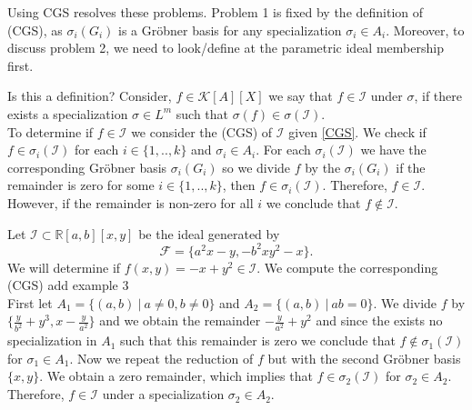 \documentclass[runningheads]{llncs}
\newcommand{\Rr}{\mathbb{R}}
\newcommand{\1}{\chi}
\newcommand{\Ff}{\mathcal{F}}
\newcommand{\Ii}{\mathcal{I}}
\newcommand{\Kk}{\mathcal{K}}
\begin{document}
Using CGS resolves these problems. Problem 1 is {\color{red}fixed} by the definition of (CGS), as $\sigma_i(G_i)$ is a 
 Gr{\"o}bner basis for any specialization $\sigma_i\in A_i$. Moreover, 
 to discuss problem 2, we need to look/define at the parametric ideal membership first.

{\color{red} Is this a definition?}
 Consider, $f\in \Kk[A][X]$ we say that $f\in\Ii$ under $\sigma$, if there exists a specialization 
 $\sigma\in L^m$ such that $\sigma(f)\in\sigma(\Ii)$.\\

To determine if $f\in\Ii$ we consider the (CGS) of $\Ii$ given \ref{CGS}. 
We check if $f\in\sigma_i(\Ii)$ for each $i\in\{1,..,k\}$ and $\sigma_i\in A_i$.
For each $\sigma_i(\Ii)$ we have the corresponding Gr{\"o}bner basis $\sigma_i(G_i)$
so we divide $f$ by the $\sigma_i(G_i)$ if the remainder is zero for some $i\in\{1,..,k\}$,
then $f\in\sigma_i(\Ii)$. Therefore, $f\in\Ii$. However, if the remainder is non-zero for all $i$ we conclude that 
$f\notin\Ii$.

\begin{example}
	Let $\mathcal{I}\subset \Rr[a,b][x,y]$ be the ideal generated by 
    $$\Ff=\{a^2 x - y, -b^2 x y^2 - x\}.$$
	We will determine if $f(x,y)=-x+y^2\in\mathcal{I}$.
	We compute the corresponding (CGS)
	{\color{red} add example 3}\\
	First let $A_1=\{(a,b)~|~ a\ne 0, b\ne 0\}$ and $A_2=\{(a,b)~|~ ab=0\}$. 
	We divide $f$ by $\{\frac{y}{b^2}+y^3,x-\frac{y}{a^2}\}$ and we obtain the remainder $-\frac{y}{a^2}+y^2$ and 
	since the exists no specialization in $A_1$ such that this remainder is zero we conclude that $f\notin \sigma_1(\Ii)$ for
	$\sigma_1\in A_1$. Now we repeat the reduction of $f$ but with the second Gr{\"o}bner basis $\{x,y\}$. We obtain a zero remainder, which implies that 
	$f\in \sigma_2(\Ii)$ for $\sigma_2\in A_2$. Therefore, $f\in\Ii$ under a specialization $\sigma_2\in A_2$.
\end{example}







\newpage
\end{document}
